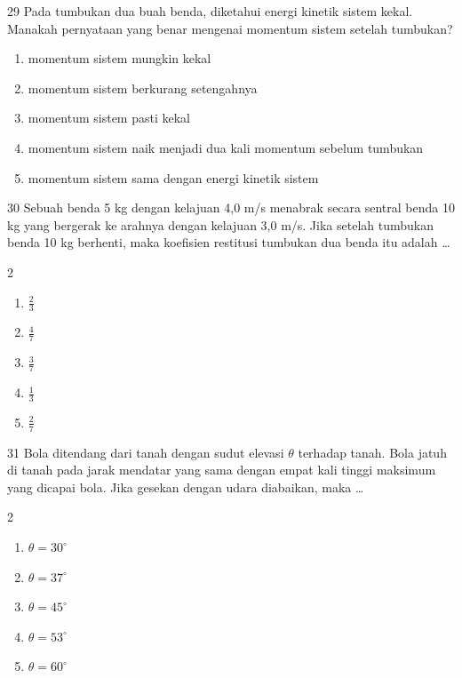\documentclass[11pt]{article}
\newenvironment{pil}{%
  \begin{enumerate}[label=(\Alph*),leftmargin=*,itemsep=1pt,topsep=3pt]}%
  {\end{enumerate}}
\newenvironment{pilB}{%
  \par\smallskip\begin{multicols}{2}
  \begin{enumerate}[label=(\Alph*),leftmargin=*,itemsep=1pt,topsep=3pt]}%
  {\end{enumerate}\end{multicols}}
\begin{document}
\begin{soal}{29}
Pada tumbukan dua buah benda, diketahui energi kinetik sistem kekal.
Manakah pernyataan yang benar mengenai momentum sistem setelah tumbukan?
\begin{pil}
  \item momentum sistem mungkin kekal
  \item momentum sistem berkurang setengahnya
  \item momentum sistem pasti kekal
  \item momentum sistem naik menjadi dua kali momentum sebelum tumbukan
  \item momentum sistem sama dengan energi kinetik sistem
\end{pil}
\end{soal}

\begin{soal}{30}
Sebuah benda 5 kg dengan kelajuan 4,0 m/s menabrak secara sentral benda
10 kg yang bergerak ke arahnya dengan kelajuan 3,0 m/s. Jika setelah
tumbukan benda 10 kg berhenti, maka koefisien restitusi tumbukan dua
benda itu adalah \ldots
\begin{pilB}
  \item $\tfrac{2}{3}$ \item $\tfrac{4}{7}$ \item $\tfrac{3}{7}$
  \item $\tfrac{1}{3}$ \item $\tfrac{2}{7}$
\end{pilB}
\end{soal}


\begin{soal}{31}
Bola ditendang dari tanah dengan sudut elevasi $\theta$ terhadap tanah.
Bola jatuh di tanah pada jarak mendatar yang sama dengan empat kali
tinggi maksimum yang dicapai bola. Jika gesekan dengan udara diabaikan,
maka \ldots
\begin{pilB}
  \item $\theta=30^\circ$ \item $\theta=37^\circ$ \item $\theta=45^\circ$
  \item $\theta=53^\circ$ \item $\theta=60^\circ$
\end{pilB}
\end{soal}
\end{document}
